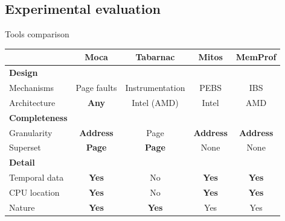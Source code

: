 \documentclass[xcolor={usenames,dvipsnames},hyperref={pdfusetitle}]{beamer}
\begin{document}
\subsection{Experimental evaluation}

\begin{frame}{Tools comparison}
    \small
    \begin{tabular}{lcccc}
        \toprule
         & \textbf{Moca} & \textbf{Tabarnac} & \textbf{Mitos} & \textbf{MemProf} \\
            \midrule
            \textbf{Design} & & & &\\
            \midrule
            Mechanisms   & Page faults  & Instrumentation & PEBS & IBS \\
            Architecture & \textbf{Any} & Intel (AMD) & Intel & AMD   \\
            \midrule
            \textbf{Completeness} & & & &\\
            \midrule
            Granularity & \textbf{Address} & Page          & \textbf{Address} & \textbf{Address} \\
            Superset          & \textbf{Page} & \textbf{Page} & None             & None             \\
            \midrule
            \textbf{Detail} & & & &\\
            \midrule
            Temporal data & \textbf{Yes} & No          & \textbf{Yes} & \textbf{Yes} \\
            CPU location  & \textbf{Yes} & No          & \textbf{Yes} & \textbf{Yes} \\
            Nature        & \textbf{Yes} &\textbf{Yes} & Yes         & Yes       \\
        \bottomrule
    \end{tabular}
\end{frame}
\end{document}
